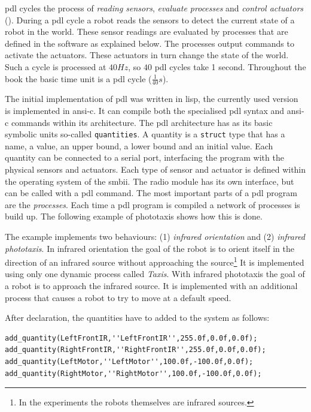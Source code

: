 {\sc pdl} cycles the process of {\em reading sensors}, {\em evaluate processes} and {\em control actuators} (). During a {\sc pdl} cycle a robot reads the sensors to detect the current state of a robot in the world. These sensor readings are evaluated by processes that are defined in the software as explained below. The processes output commands to activate the actuators. These actuators in turn change the state of the world. Such a cycle is processed at $40 Hz$, so $40$ {\sc pdl} cycles take 1 second. Throughout the book the basic time unit is a {\sc pdl} cycle ($\frac{1}{40} s$).

The initial implementation of {\sc pdl} was written in {\sc lisp}, the currently used version is implemented in {\sc ansi-c}. It can compile both the specialised {\sc pdl} syntax and {\sc ansi-c} commands within its architecture. The {\sc pdl} architecture has as its basic symbolic units so-called \texttt{quantities}. A quantity is a \texttt{struct} type that has a {\sc name}, a {\sc value}, an {\sc upper bound}, a {\sc lower bound} and an {\sc initial value}. Each quantity can be connected to a serial port, interfacing the program with the physical sensors and actuators. Each type of sensor and actuator is defined within the operating system of the {\sc smbii}. The radio module has its own interface, but can be called with a {\sc pdl} command. The most important parts of a {\sc pdl} program are the {\em processes}. Each time a {\sc pdl} program is compiled a network of processes is build up. The following example of phototaxis shows how this is done.



The example implements two behaviours: (1) {\em infrared orientation} and (2) {\em infrared phototaxis}. In infrared orientation the goal of the robot is to orient itself in the direction of an infrared source without approaching the source\footnote{In the experiments the robots themselves are infrared sources.} It is implemented using only one dynamic process called {\em Taxis}. With infrared phototaxis the goal of a robot is to approach the infrared source. It is implemented with an additional process that causes a robot to try to move at a default speed. 


After declaration, the quantities have to added to the system as follows:


{\small\begin{verbatim}
add_quantity(LeftFrontIR,''LeftFrontIR'',255.0f,0.0f,0.0f);
add_quantity(RightFrontIR,''RightFrontIR'',255.0f,0.0f,0.0f);
add_quantity(LeftMotor,''LeftMotor'',100.0f,-100.0f,0.0f);
add_quantity(RightMotor,''RightMotor'',100.0f,-100.0f,0.0f);
\end{verbatim}}

